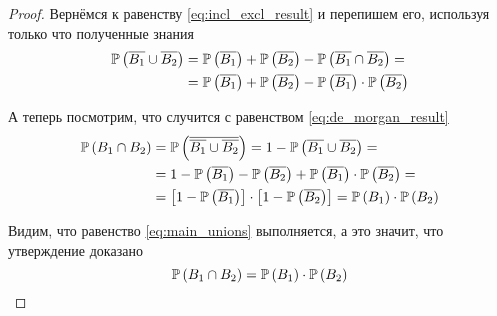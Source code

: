 \begin{proof}
    Вернёмся к равенству \eqref{eq:incl_excl_result} и перепишем его,
    используя только что полученные знания
    \begin{align*}
    \mathbb{P}\left( \overline{B_1}\cup \overline{B_2} \right)
    &=\mathbb{P}\left( \overline{B_1} \right)+\mathbb{P}\left( \overline{B_2} \right)
        -\mathbb{P}\left( \overline{B_1}\cap \overline{B_2} \right)=\\
    &=\mathbb{P}\left( \overline{B_1} \right)+\mathbb{P}\left( \overline{B_2} \right)
        -\mathbb{P}\left( \overline{B_1} \right)\cdot \mathbb{P}\left( \overline{B_2} \right)
    \end{align*}

    А теперь посмотрим, что случится с равенством \eqref{eq:de_morgan_result}
    \begin{align*}
        \mathbb{P}\left( B_1\cap B_2 \right)
        &=\mathbb{P}\left( \overline{\overline{B_1}\cup \overline{B_2}} \right)
        =1-\mathbb{P}\left( {\overline{B_1}\cup \overline{B_2}} \right)=\\
        &=1-\mathbb{P}\left( \overline{B_1} \right)-\mathbb{P}\left( \overline{B_2} \right)
        +\mathbb{P}\left( \overline{B_1} \right)\cdot \mathbb{P}\left( \overline{B_2} \right)=\\
        &=\left[1-\mathbb{P}\left( \overline{B_1} \right)\right]
            \cdot\left[1-\mathbb{P}\left( \overline{B_2} \right)\right]
        =\mathbb{P}\left( B_1 \right)\cdot\mathbb{P}\left( B_2 \right)
    \end{align*}

    Видим, что равенство \eqref{eq:main_unions} выполняется,
    а это значит, что утверждение доказано
    $$\mathbb{P}\left( B_1\cap B_2 \right)=\mathbb{P}\left( B_1 \right)\cdot\mathbb{P}\left( B_2 \right)$$

\end{proof}
